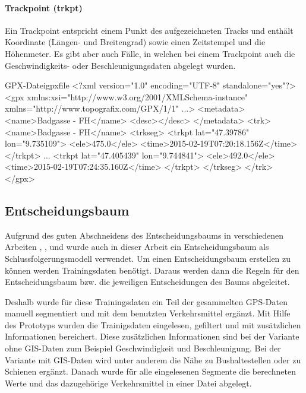 \paragraph{Trackpoint (trkpt)}
Ein Trackpoint entspricht einem Punkt des aufgezeichneten Tracks und enthält Koordinate (Längen- und Breitengrad) sowie einen Zeitstempel und die Höhenmeter. Es gibt aber auch Fälle, in welchen bei einem Trackpoint auch die Geschwindigkeits- oder Beschleunigungsdaten abgelegt wurden.
 

\begin{code}[xml]{GPX-Datei}{gpxfile}
<?xml version="1.0" encoding="UTF-8" standalone="yes"?>
<gpx xmlns:xsi="http://www.w3.org/2001/XMLSchema-instance" xmlns="http://www.topografix.com/GPX/1/1" ...>
    <metadata>
        <name>Badgasse - FH</name>
        <desc></desc>
    </metadata>
    <trk>
        <name>Badgasse - FH</name>
        <trkseg>
            <trkpt lat="47.39786" lon="9.735109">
                <ele>475.0</ele>
                <time>2015-02-19T07:20:18.156Z</time>
            </trkpt>
            ...
            <trkpt lat="47.405439" lon="9.744841">
                <ele>492.0</ele>
                <time>2015-02-19T07:24:35.160Z</time>
            </trkpt>
        </trkseg>
    </trk>
</gpx>
\end{code}

\subsection{Entscheidungsbaum}
Aufgrund des guten Abschneidens des Entscheidungsbaums in verschiedenen Arbeiten  \cite{stenneth_transportation_2011}, \cite{reddy_using_2010}, \cite{sebastian_nagel_moglichkeitsstudie_2011}und \cite{zheng_learning_2008} wurde auch in dieser Arbeit ein Entscheidungsbaum als Schlussfolgerungsmodell verwendet. Um einen Entscheidungsbaum erstellen zu können werden Trainingsdaten benötigt. Daraus werden dann die Regeln für den Entscheidungsbaum bzw. die jeweiligen Entscheidungen des Baums abgeleitet.

Deshalb wurde für diese Trainingsdaten ein Teil der gesammelten GPS-Daten manuell segmentiert und mit dem benutzten Verkehrsmittel ergänzt. Mit Hilfe des Prototyps wurden die Trainigsdaten eingelesen, gefiltert und mit zusätzlichen Informationen bereichert. Diese zusätzlichen Informationen sind bei der Variante ohne GIS-Daten zum Beispiel Geschwindigkeit und Beschleunigung. Bei der Variante mit GIS-Daten wird unter anderem die Nähe zu Bushaltestellen oder zu Schienen ergänzt. Danach wurde für alle eingelesenen Segmente die berechneten Werte und das dazugehörige Verkehrsmittel in einer Datei abgelegt.

